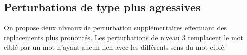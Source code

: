         \subsection{Perturbations de type \replace plus agressives}
        
        On propose deux niveaux de perturbation supplémentaires effectuant des replacements plus prononcés. Les perturbations de niveau 3 remplacent le mot ciblé par un mot n'ayant aucun lien avec les différents sens du mot ciblé. 
        

